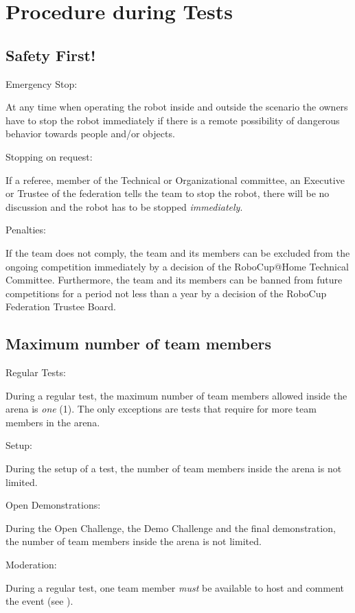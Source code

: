 \section{Procedure during Tests}

\subsection{Safety First!}\label{rule:safetyfirst}
\begin{enumerate}
{\bf\item Emergency Stop:} At any time when operating the robot inside and outside the 
  scenario the owners have to stop the robot immediately if there is a remote possibility 
  of dangerous behavior towards people and/or objects. 
{\bf\item Stopping on request:} If a referee, member of the Technical or Organizational 
  committee, an Executive or Trustee of the federation tells the team to stop the robot, 
  there will be no discussion and the robot has to be stopped \emph{immediately}.
{\bf\item Penalties:} If the team does not comply, the team and its members can be excluded 
  from the ongoing competition immediately by a decision of the RoboCup@Home Technical Committee. 
  Furthermore, the team and its members can be banned from future competitions for a period 
  not less than a year by a decision of the RoboCup Federation Trustee Board.
\end{enumerate}



\subsection{Maximum number of team members}\label{rule:number_of_people}
\begin{enumerate}
  {\bf\item Regular Tests:} During a regular test, the maximum number of team members allowed inside the arena is \emph{one} (1).
    The only exceptions are tests that require for more team members in the arena.
  {\bf\item Setup:} During the setup of a test, 
    the number of team members inside the arena is not limited. 
  {\bf\item Open Demonstrations:} During the Open Challenge, the Demo Challenge and the final demonstration, 
    the number of team members inside the arena is not limited. 
  {\bf\item Moderation:} During a regular test, one team member \emph{must} be available to host and comment the event (see ).
\end{enumerate}



